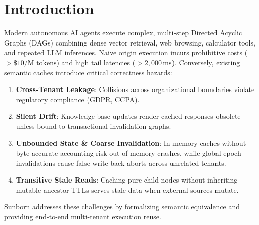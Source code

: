 \documentclass[sigconf,screen=true]{acmart}
\begin{document}


\maketitle

\section{Introduction}
Modern autonomous AI agents execute complex, multi-step Directed Acyclic Graphs (DAGs) combining dense vector retrieval, web browsing, calculator tools, and repeated LLM inferences. Naive origin execution incurs prohibitive costs ($>\$10/\text{M tokens}$) and high tail latencies ($>2{,}000\,\text{ms}$). Conversely, existing semantic caches introduce critical correctness hazards:
\begin{enumerate}
    \item \textbf{Cross-Tenant Leakage}: Collisions across organizational boundaries violate regulatory compliance (GDPR, CCPA).
    \item \textbf{Silent Drift}: Knowledge base updates render cached responses obsolete unless bound to transactional invalidation graphs.
    \item \textbf{Unbounded State \& Coarse Invalidation}: In-memory caches without byte-accurate accounting risk out-of-memory crashes, while global epoch invalidations cause false write-back aborts across unrelated tenants.
    \item \textbf{Transitive Stale Reads}: Caching pure child nodes without inheriting mutable ancestor TTLs serves stale data when external sources mutate.
\end{enumerate}

Sunborn addresses these challenges by formalizing semantic equivalence and providing end-to-end multi-tenant execution reuse.
\end{document}
